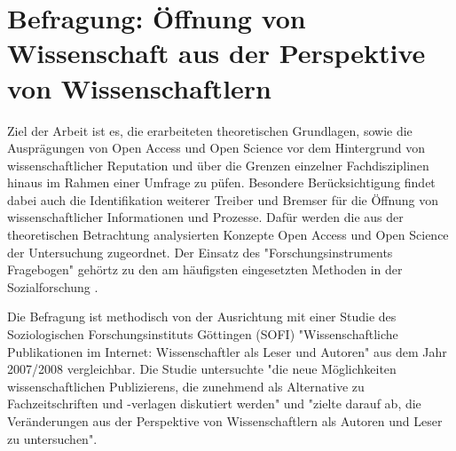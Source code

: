\chapter{Befragung: Öffnung von Wissenschaft aus der Perspektive von Wissenschaftlern}

Ziel der Arbeit ist es, die erarbeiteten theoretischen Grundlagen, sowie die Ausprägungen von Open Access und Open Science vor dem Hintergrund von wissenschaftlicher Reputation und über die Grenzen einzelner Fachdisziplinen hinaus im Rahmen einer Umfrage zu püfen. Besondere Berücksichtigung findet dabei auch die Identifikation weiterer Treiber und Bremser für die Öffnung von wissenschaftlicher Informationen und Prozesse. Dafür werden die aus der theoretischen Betrachtung analysierten Konzepte Open Access und Open Science der Untersuchung zugeordnet. Der Einsatz des "Forschungsinstruments Fragebogen" gehörtz zu den am häufigsten eingesetzten Methoden in der Sozialforschung \cite{raab_2012_fragebogen}.

Die Befragung ist methodisch von der Ausrichtung mit einer Studie des Soziologischen Forschungsinstituts Göttingen (SOFI) "Wissenschaftliche Publikationen im Internet: Wissenschaftler als Leser und Autoren" aus dem Jahr 2007/2008 vergleichbar. Die Studie untersuchte "die neue Möglichkeiten wissenschaftlichen Publizierens, die zunehmend als Alternative zu Fachzeitschriften und -verlagen diskutiert werden" und "zielte darauf ab, die Veränderungen aus der Perspektive von Wissenschaftlern als Autoren und Leser zu untersuchen"\cite{SOFI_Webseite}.

